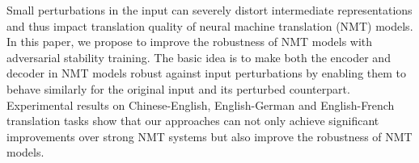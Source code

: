 Small perturbations in the input can severely distort intermediate representations and thus impact translation quality of neural machine translation (NMT) models. In this paper, we propose to improve the robustness of NMT models with adversarial stability training. The basic idea is to make both the encoder and decoder in NMT models robust against input perturbations by enabling them to behave similarly for the original input and its perturbed counterpart. Experimental results on Chinese-English, English-German and English-French translation tasks show that our approaches can not only achieve significant improvements over strong NMT systems but also improve the robustness of NMT models.
